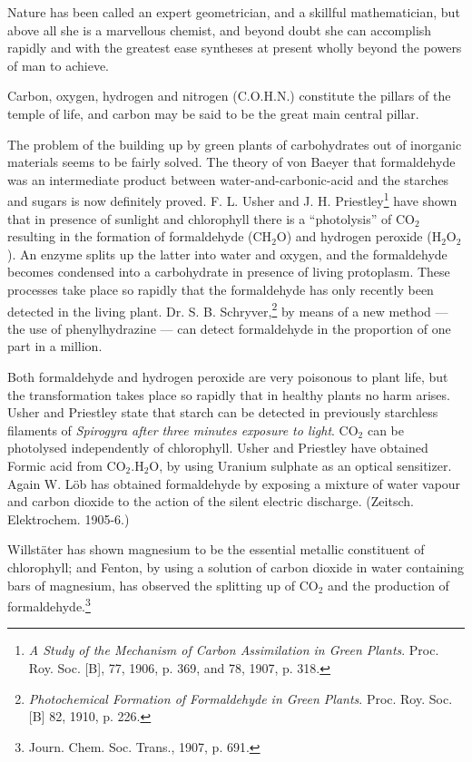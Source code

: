\documentclass[a4paper, 12pt, oneside]{article}
\begin{document}
Nature has been called an expert geometrician, and a skillful mathematician, but above all she is a marvellous chemist, and beyond doubt she can accomplish rapidly and with the greatest ease syntheses at present wholly beyond the powers of man to achieve.

Carbon, oxygen, hydrogen and nitrogen (C.O.H.N.) constitute the pillars of the temple of life, and carbon may be said to be the great main central pillar.

The problem of the building up by green plants of carbohydrates out of inorganic materials seems to be fairly solved. The theory of von Baeyer that formaldehyde was an intermediate product between water-and-carbonic-acid and the starches and sugars is now definitely proved. F. L. Usher and J. H. Priestley\footnote{\emph{A Study of the Mechanism of Carbon Assimilation in Green Plants}. Proc. Roy. Soc. [B], 77, 1906, p. 369, and 78, 1907, p. 318.} have shown that in presence of sunlight and chlorophyll there is a ``photolysis'' of CO$_{2}$ resulting in the formation of formaldehyde (CH$_{2}$O) and hydrogen peroxide (H$_{2}$O$_{2}$). An enzyme splits up the latter into water and oxygen, and the formaldehyde becomes condensed into a carbohydrate in presence of living protoplasm. These processes take place so rapidly that the formaldehyde has only recently been detected in the living plant. Dr. S. B. Schryver,\footnote{\emph{Photochemical Formation of Formaldehyde in Green Plants}. Proc. Roy. Soc. [B] 82, 1910, p. 226.} by means of a new method --- the use of phenylhydrazine --- can detect formaldehyde in the proportion of one part in a million.

Both formaldehyde and hydrogen peroxide are very poisonous to plant life, but the transformation takes place so rapidly that in healthy plants no harm arises. Usher and Priestley state that starch can be detected in previously starchless filaments of \emph{Spirogyra after three minutes exposure to light}. CO$_{2}$ can be photolysed independently of chlorophyll. Usher and Priestley have obtained Formic acid from CO$_{2}$.H$_{2}$O, by using Uranium sulphate as an optical sensitizer. Again W. Löb has obtained formaldehyde by exposing a mixture of water vapour and carbon dioxide to the action of the silent electric discharge. (Zeitsch. Elektrochem. 1905-6.)

Willstäter has shown magnesium to be the essential metallic constituent of chlorophyll; and Fenton, by using a solution of carbon dioxide in water containing bars of magnesium, has observed the splitting up of CO$_{2}$ and the production of formaldehyde.\footnote{Journ. Chem. Soc. Trans., 1907, p. 691.}
\end{document}
